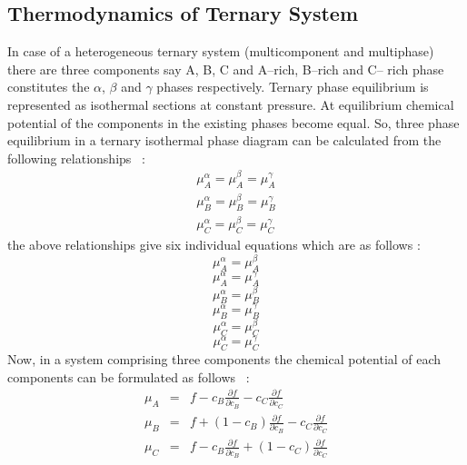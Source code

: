 \documentclass[12pt]{iiscthes}
\theoremstyle{definition}
\theoremstyle{definition}
\theoremstyle{remark}
\begin{document}
\begin{appendices}
\chapter{Thermodynamics of Ternary System}
In case of a heterogeneous ternary system (multicomponent and multiphase) there are three components say A, B, C and A--rich, B--rich and C-- rich phase constitutes the $ \alpha $, $ \beta $ and $ \gamma $ phases respectively. Ternary phase equilibrium is represented as isothermal sections at constant pressure. At equilibrium chemical potential of the components in the existing phases become equal. So, three phase equilibrium in a ternary isothermal phase diagram can be calculated from the following relationships~\cite{lupis} :
\begin{eqnarray}
\mu_A^\alpha = \mu_A^\beta = \mu_A^\gamma\nonumber\\
\mu_B^\alpha = \mu_B^\beta = \mu_B^\gamma\nonumber\\
\mu_C^\alpha = \mu_C^\beta = \mu_C^\gamma
\end{eqnarray}
the above relationships give six individual equations which are as follows : 
\begin{equation}\label{1}\mu_A^\alpha = \mu_A^\beta\end{equation}
\begin{equation}\label{2}\mu_A^\alpha = \mu_A^\gamma\end{equation}
\begin{equation}\label{3}\mu_B^\alpha = \mu_B^\beta\end{equation}
\begin{equation}\label{4}\mu_B^\alpha = \mu_B^\gamma\end{equation}
\begin{equation}\label{5}\mu_C^\alpha = \mu_C^\beta\end{equation}
\begin{equation}\label{6}\mu_C^\alpha = \mu_C^\gamma\end{equation}
Now, in a system comprising three components the chemical potential of each components can be formulated as follows~\cite{lupis} :
\begin{eqnarray}\label{7}
\mu_A &=& f-c_B\frac{\partial f}{\partial c_B}-c_C\frac{\partial f}{\partial c_C}\nonumber\\
\mu_B &=& f+(1-c_B)\frac{\partial f}{\partial c_B}-c_C\frac{\partial f}{\partial c_C}\nonumber\\
\mu_C &=& f-c_B\frac{\partial f}{\partial c_B}+(1-c_C)\frac{\partial f}{\partial c_C}

\end{eqnarray}
\end{appendices}
\end{document}
